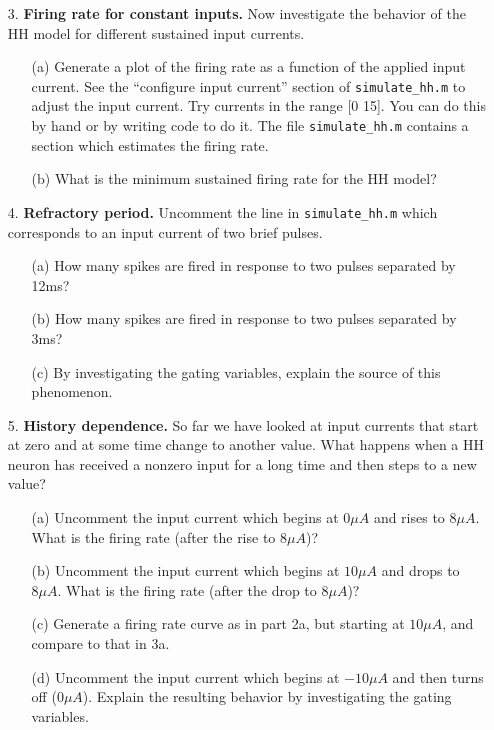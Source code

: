 \documentclass{article}
\begin{document}
\begin{itemize}
\item[]

\item[3.] \textbf{Firing rate for constant inputs.} 
Now investigate the behavior of the HH model for different sustained input currents.

\begin{itemize}
\item[(a)] Generate a plot of the firing rate as a function of the applied input current. See the ``configure input current'' section of \verb|simulate_hh.m| to adjust the input current. Try currents in the range [0 15]. You can do this by hand or by writing code to do it. The file \verb|simulate_hh.m| contains a section which estimates the firing rate.
\item[(b)] What is the minimum sustained firing rate for the HH model? 
\end{itemize}

\item[]

\item[4.] \textbf{Refractory period.} Uncomment the line in \verb|simulate_hh.m| which corresponds to an input current of two brief pulses.
\begin{itemize}
\item[(a)]  How many spikes are fired in response to two pulses separated by 12ms?
\item[(b)]  How many spikes are fired in response to two pulses separated by 3ms? 
\item[(c)]  By investigating the gating variables, explain the source of this phenomenon.
\end{itemize}



\item[]
\item[5.] \textbf{History dependence.}
So far we have looked at input currents that start at zero and at some time change to another value. What happens when a HH neuron has received a nonzero input for a long time and then steps to a new value?
\begin{itemize}
\item[(a)]  Uncomment the input current which begins at $0\mu A$ and rises to $8\mu A$. What is the firing rate (after the rise to $8 \mu A$)?
\item[(b)]  Uncomment the input current which begins at $10\mu A$ and drops to $8\mu A$. What is the firing rate (after the drop to $8 \mu A$)?
\item[(c)]  Generate a firing rate curve as in part 2a, but starting at $10\mu A$, and compare to that in 3a.
\item[(d)] Uncomment the input current which begins at $-10\mu A$ and then turns off ($0\mu A$). Explain the resulting behavior by investigating the gating variables.
\end{itemize}


\end{itemize}
\end{document}
